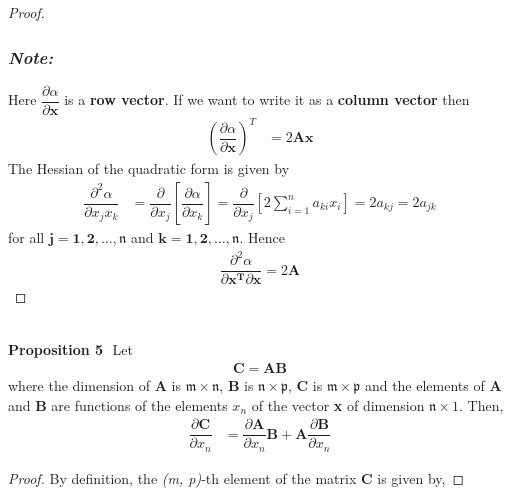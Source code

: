\documentclass[14pt]{extarticle}
\begin{document}
\begin{flushleft}
\begin{large}
\begin{proof}
\subsubsection*{\emph{Note:}}
Here $\dfrac{\partial \alpha}{\partial \mathbf{x}}$ is a \textbf{row vector}. If we want to write it as a \textbf{column vector} then
\begin{align}
\left(\dfrac{\partial \alpha}{\partial \mathbf{x}}\right)^T &= 2\mathbf{Ax}
\end{align}
The Hessian of the quadratic form is given by
\begin{align}
\dfrac{\partial^2 \alpha}{\partial x_jx_k} &= \dfrac{\partial}{\partial x_j} \left[\dfrac{\partial \alpha}{\partial x_k}\right] = \dfrac{\partial}{\partial x_j} \left[2\sum_{i=1}^{n} a_{ki}x_i\right] = 2a_{kj} = 2a_{jk}
\end{align}
for all $\mathbf{j = 1,2,\ldots,\mathfrak{n}}$ and $\mathbf{k = 1,2,\ldots,\mathfrak{n}}$. Hence
\begin{align}
\dfrac{\partial^2 \alpha}{\partial \mathbf{x^T} \partial \mathbf{x}} = 2\mathbf{A}
\end{align}
\end{proof}
\\
\hfill \break
\hfill \break
\textbf{Proposition 5} \,\,Let
\begin{align}
\mathbf{C = AB}
\end{align}
where the dimension of \textbf{A} is $\mathfrak{m} \times \mathfrak{n}$, \textbf{B} is $\mathfrak{n} \times \mathfrak{p}$, \textbf{C} is $\mathfrak{m} \times \mathfrak{p}$ and the elements of \textbf{A} and \textbf{B} are functions of the elements $x_n$ of the vector \textbf{x} of dimension $\mathfrak{n} \times 1$. Then,
\begin{align}
\dfrac{\partial \mathbf{C}}{\partial x_n} &= \dfrac{\partial \mathbf{A}}{\partial x_n}\mathbf{B} + \mathbf{A}\dfrac{\partial \mathbf{B}}{\partial x_n}
\end{align}
\begin{proof}
By definition, the \emph{(m, p)}-th element of the matrix \textbf{C} is given by,

\end{proof}
\end{large}
\end{flushleft}
\end{document}
